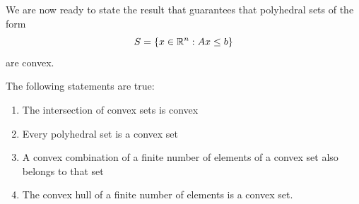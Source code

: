 We are now ready to state the result that guarantees that polyhedral sets of the form
$$
	S = \left\{ x \in \mathbb{R}^n : Ax \le b \right \}
$$
are convex. 

\begin{theorem} \label{p1c2:thm:convexity}
	The following statements are true:
	\begin{enumerate}
		\item The intersection of convex sets is convex
		\item Every polyhedral set is a convex set
		\item A convex combination of a finite number of elements of a convex set also belongs to that set
		\item The convex hull of a finite number of elements is a convex set.			
	\end{enumerate}
\end{theorem}

